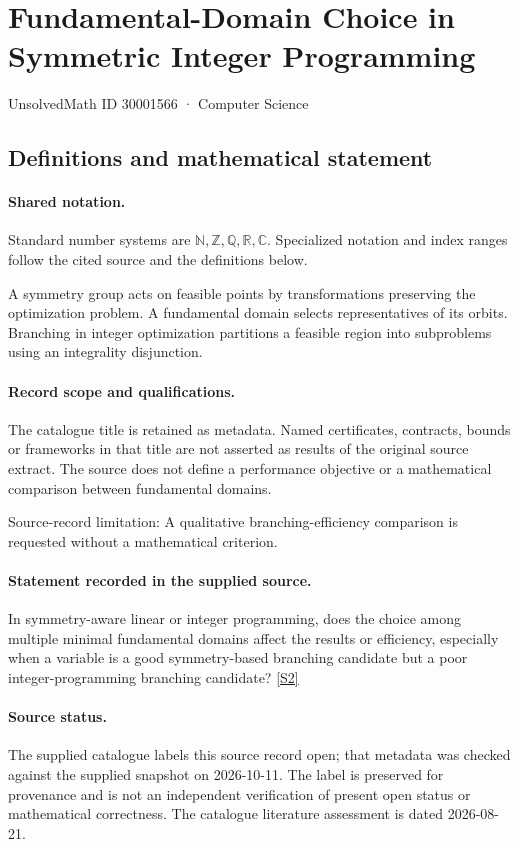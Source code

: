 \documentclass[11pt]{article}
\newcommand{\sref}[2]{\hyperlink{source:#1:#2}{[S#2]}}
\begin{document}
\setcounter{section}{30001565}
\section{Fundamental-Domain Choice in Symmetric Integer Programming}\label{30001566}
{\small\sffamily UnsolvedMath ID 30001566 · Computer Science}
\subsection{Definitions and mathematical statement}

\paragraph{Shared notation.}Standard number systems are $\mathbb N,\mathbb Z,\mathbb Q,\mathbb R,\mathbb C$. Specialized notation and index ranges follow the cited source and the definitions below.


A symmetry group acts on feasible points by transformations preserving the optimization problem. A fundamental domain selects representatives of its orbits. Branching in integer optimization partitions a feasible region into subproblems using an integrality disjunction.
\paragraph{Record scope and qualifications.}
The catalogue title is retained as metadata. Named certificates, contracts, bounds or frameworks in that title are not asserted as results of the original source extract.
The source does not define a performance objective or a mathematical comparison between fundamental domains.

Source-record limitation: A qualitative branching-efficiency comparison is requested without a mathematical criterion.
\paragraph{Statement recorded in the supplied source.}
In symmetry-aware linear or integer programming, does the choice among multiple minimal fundamental domains affect the results or efficiency, especially when a variable is a good symmetry-based branching candidate but a poor integer-programming branching candidate? \sref{30001566}{2}
\paragraph{Source status.}
The supplied catalogue labels this source record open; that metadata was checked against the supplied snapshot on 2026-10-11. The label is preserved for provenance and is not an independent verification of present open status or mathematical correctness. The catalogue literature assessment is dated 2026-08-21.
\end{document}
